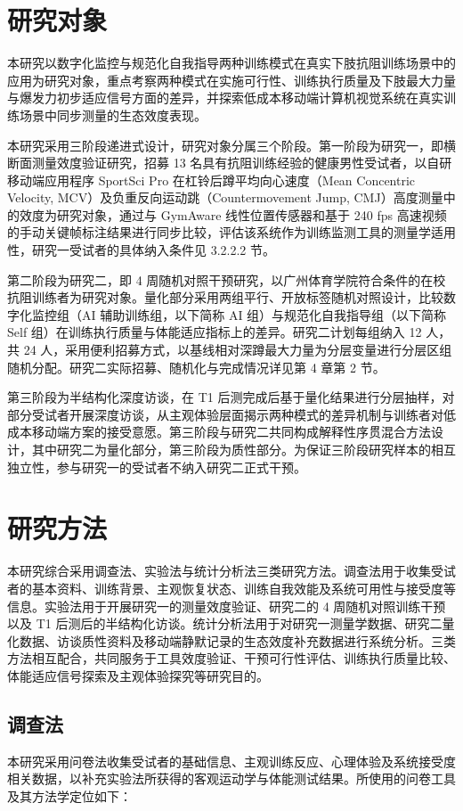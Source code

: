 \documentclass[UTF8,zihao=-4,twoside,openany]{ctexbook}
\begin{document}
\section{研究对象}
本研究以数字化监控与规范化自我指导两种训练模式在真实下肢抗阻训练场景中的应用为研究对象，重点考察两种模式在实施可行性、训练执行质量及下肢最大力量与爆发力初步适应信号方面的差异，并探索低成本移动端计算机视觉系统在真实训练场景中同步测量的生态效度表现。

本研究采用三阶段递进式设计，研究对象分属三个阶段。第一阶段为研究一，即横断面测量效度验证研究，招募 13 名具有抗阻训练经验的健康男性受试者，以自研移动端应用程序 SportSci Pro 在杠铃后蹲平均向心速度（Mean Concentric Velocity, MCV）及负重反向运动跳（Countermovement Jump, CMJ）高度测量中的效度为研究对象，通过与 GymAware 线性位置传感器和基于 240 fps 高速视频的手动关键帧标注结果进行同步比较，评估该系统作为训练监测工具的测量学适用性，研究一受试者的具体纳入条件见 3.2.2.2 节。

第二阶段为研究二，即 4 周随机对照干预研究，以广州体育学院符合条件的在校抗阻训练者为研究对象。量化部分采用两组平行、开放标签随机对照设计，比较数字化监控组（AI 辅助训练组，以下简称 AI 组）与规范化自我指导组（以下简称 Self 组）在训练执行质量与体能适应指标上的差异。研究二计划每组纳入 12 人，共 24 人，采用便利招募方式，以基线相对深蹲最大力量为分层变量进行分层区组随机分配。研究二实际招募、随机化与完成情况详见第 4 章第 2 节。

第三阶段为半结构化深度访谈，在 T1 后测完成后基于量化结果进行分层抽样，对部分受试者开展深度访谈，从主观体验层面揭示两种模式的差异机制与训练者对低成本移动端方案的接受意愿。第三阶段与研究二共同构成解释性序贯混合方法设计，其中研究二为量化部分，第三阶段为质性部分。为保证三阶段研究样本的相互独立性，参与研究一的受试者不纳入研究二正式干预。

\section{研究方法}
本研究综合采用调查法、实验法与统计分析法三类研究方法。调查法用于收集受试者的基本资料、训练背景、主观恢复状态、训练自我效能及系统可用性与接受度等信息。实验法用于开展研究一的测量效度验证、研究二的 4 周随机对照训练干预以及 T1 后测后的半结构化访谈。统计分析法用于对研究一测量学数据、研究二量化数据、访谈质性资料及移动端静默记录的生态效度补充数据进行系统分析。三类方法相互配合，共同服务于工具效度验证、干预可行性评估、训练执行质量比较、体能适应信号探索及主观体验探究等研究目的。

\subsection{调查法}
本研究采用问卷法收集受试者的基础信息、主观训练反应、心理体验及系统接受度相关数据，以补充实验法所获得的客观运动学与体能测试结果。所使用的问卷工具及其方法学定位如下：
\end{document}
